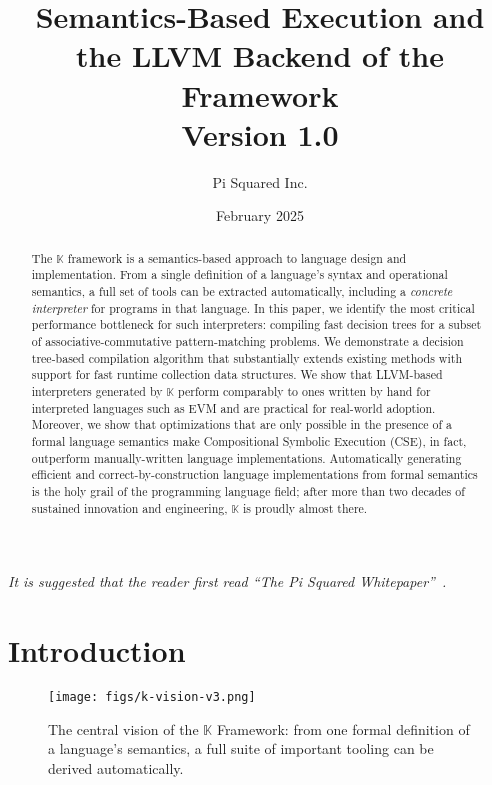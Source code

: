 \documentclass{article}
\title{Semantics-Based Execution and the LLVM Backend of the \K Framework\\\Large Version 1.0}
\author{Pi Squared Inc.}
\date{February 2025}
\theoremstyle{definition}
\newcommand{\K}{$\mathbb{K}$\xspace}
\begin{document}
\maketitle

{\parbox{0.86\textwidth}{\small\em 
It is suggested that the reader first read ``The Pi Squared Whitepaper''~\cite{pi2paper}.
}}



\begin{abstract}
The \K framework is a semantics-based approach to language design and implementation. From a single definition of a language's syntax and operational semantics, a full set of tools can be extracted automatically, including a \emph{concrete interpreter} for programs in that language. In this paper, we identify the most critical performance bottleneck for such interpreters: compiling fast decision trees for a subset of associative-commutative pattern-matching problems. We demonstrate a decision tree-based compilation algorithm that substantially extends existing methods with support for fast runtime collection data structures. We show that LLVM-based interpreters generated by \K perform comparably to ones written by hand for interpreted languages such as EVM and are practical for real-world adoption.  Moreover, we show that optimizations that are only possible in the presence of a formal language semantics make Compositional Symbolic Execution (CSE), in fact, outperform manually-written language implementations.  Automatically generating efficient and correct-by-construction language implementations from formal semantics is the holy grail of the programming language field; after more than two decades of sustained innovation and engineering, \K is proudly almost there.
\end{abstract}

\newpage 

\renewcommand{\contentsname}{Table of Contents}
\tableofcontents

\newpage

\section{Introduction}
\begin{figure}[t]
  \centering
  \texttt{[image: figs/k-vision-v3.png]}
  \caption{
    The central vision of the \K Framework: from one formal definition of
    a language's semantics, a full suite of important tooling can be derived
    automatically.
  }
  \label{fig:k-vision}
\end{figure}
\end{document}
